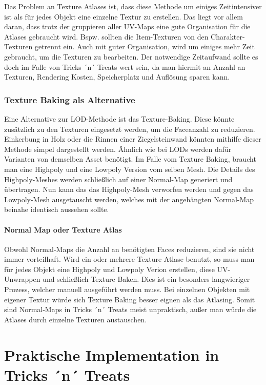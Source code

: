 Das Problem an Texture Atlases ist, dass diese Methode um einiges Zeitintensiver ist als für jedes Objekt eine einzelne Textur zu erstellen. Das liegt vor allem daran, dass trotz der gruppieren aller UV-Maps eine gute Organisation für die Atlases gebraucht wird. Bspw. sollten die Item-Texturen von den Charakter-Texturen getrennt ein. Auch mit guter Organisation, wird um einiges mehr Zeit gebraucht, um die Texturen zu bearbeiten. Der notwendige Zeitaufwand sollte es doch im Falle von Tricks ´n´ Treats wert sein, da man hiermit an Anzahl an Texturen, Rendering Kosten, Speicherplatz und Auflösung sparen kann.

\subsection{Texture Baking als Alternative}

Eine Alternative zur LOD-Methode ist das Texture-Baking. Diese könnte zusätzlich zu den Texturen eingesetzt werden, um die Faceanzahl zu reduzieren. Einkerbung in Holz oder die Rinnen einer Ziegelsteinwand könnten mithilfe dieser Methode simpel dargestellt werden. Ähnlich wie bei LODs werden dafür Varianten von demselben Asset benötigt. Im Falle vom Texture Baking, braucht man eine Highpoly und eine Lowpoly Version vom selben Mesh. Die Details des Highpoly-Meshes werden schließlich auf einer Normal-Map generiert und übertragen. Nun kann das das Highpoly-Mesh verworfen werden und gegen das Lowpoly-Mesh ausgetauscht werden, welches mit der angehängten Normal-Map beinahe identisch aussehen sollte.

\subsubsection{Normal Map oder Texture Atlas}

Obwohl Normal-Maps die Anzahl an benötigten Faces reduzieren, sind sie nicht immer vorteilhaft. Wird ein oder mehrere Texture Atlase benutzt, so muss man für jedes Objekt eine Highpoly und Lowpoly Verion erstellen, diese UV-Unwrappen und schließlich Texture Baken. Dies ist ein besonders langwieriger Prozess, welcher manuell ausgeführt werden muss. Bei einzelnen Objekten mit eigener Textur würde sich Texture Baking besser eignen als das Atlasing. Somit sind Normal-Maps in Tricks ´n´ Treats meist unpraktisch, außer man würde die Atlases durch einzelne Texturen austauschen.

\chapter{Praktische Implementation in Tricks ´n´ Treats}

